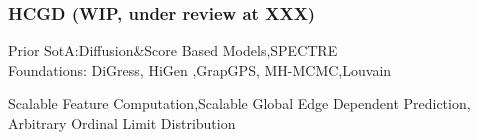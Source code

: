 \documentclass[./presentation.tex]{subfiles}
\begin{document}
\begin{frame}[t]
  \frametitle{HCGD (WIP, under review at XXX)}
  \vspace{-1cm}
  \begin{priorart}
    Prior SotA:Diffusion\&Score Based Models\cite{niuPermutationInvariantGraph2020b,songGenerativeModelingEstimating2019b},SPECTRE\cite{martinkusSPECTRESpectralConditioning2022b}\\
   Foundations: DiGress\cite{krawczukGGGANGeometricGraph2020}, HiGen \cite{karami},GrapGPS, MH-MCMC,Louvain
  \end{priorart}
  \begin{contributions}
    Scalable Feature Computation,Scalable Global Edge Dependent Prediction, Arbitrary Ordinal Limit Distribution
  \end{contributions}
\end{frame}
\end{document}
